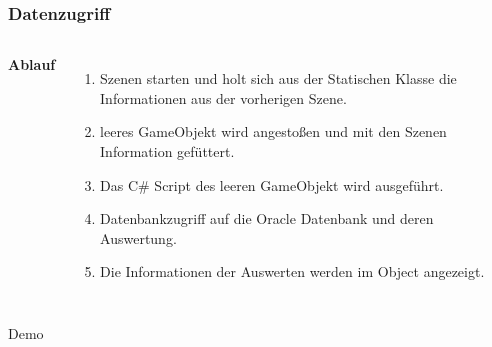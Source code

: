 \documentclass{beamer}
\begin{document}

\begin{frame}
\frametitle{Datenzugriff}
\begin{adjustbox}{totalheight=\baselineskip}
\begin{columns}[c] %


\textbf{Ablauf}
\begin{enumerate}
\item Szenen starten und holt sich aus der Statischen Klasse die Informationen aus der vorherigen Szene.
\item leeres GameObjekt wird angestoßen und mit den Szenen Information gefüttert.
\item Das C\# Script des leeren GameObjekt wird ausgeführt.
\item Datenbankzugriff auf die Oracle Datenbank und deren Auswertung.
\item Die Informationen der Auswerten werden im Object angezeigt.
\end{enumerate}



\end{columns}
\end{adjustbox}
\end{frame}


\begin{frame}
\Huge{\centerline{Demo}}
\end{frame}
\end{document}
